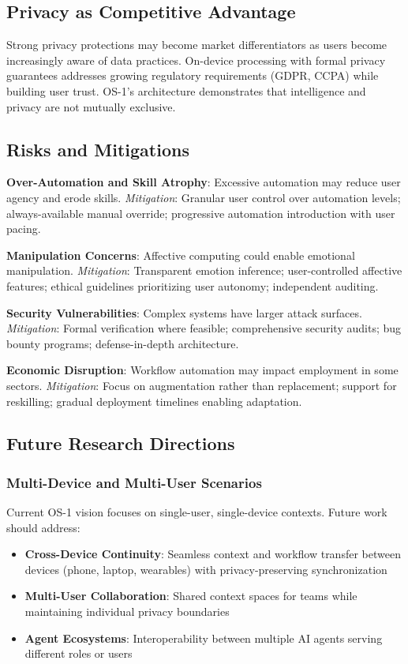 \documentclass[conference]{IEEEtran}
\begin{document}
\subsection{Privacy as Competitive Advantage}

Strong privacy protections may become market differentiators as users become increasingly aware of data practices. On-device processing with formal privacy guarantees addresses growing regulatory requirements (GDPR, CCPA) while building user trust. OS-1's architecture demonstrates that intelligence and privacy are not mutually exclusive.

\subsection{Risks and Mitigations}

\textbf{Over-Automation and Skill Atrophy}: Excessive automation may reduce user agency and erode skills. \textit{Mitigation}: Granular user control over automation levels; always-available manual override; progressive automation introduction with user pacing.

\textbf{Manipulation Concerns}: Affective computing could enable emotional manipulation. \textit{Mitigation}: Transparent emotion inference; user-controlled affective features; ethical guidelines prioritizing user autonomy; independent auditing.

\textbf{Security Vulnerabilities}: Complex systems have larger attack surfaces. \textit{Mitigation}: Formal verification where feasible; comprehensive security audits; bug bounty programs; defense-in-depth architecture.

\textbf{Economic Disruption}: Workflow automation may impact employment in some sectors. \textit{Mitigation}: Focus on augmentation rather than replacement; support for reskilling; gradual deployment timelines enabling adaptation.

\subsection{Future Research Directions}

\subsubsection{Multi-Device and Multi-User Scenarios}

Current OS-1 vision focuses on single-user, single-device contexts. Future work should address:
\begin{itemize}
\item \textbf{Cross-Device Continuity}: Seamless context and workflow transfer between devices (phone, laptop, wearables) with privacy-preserving synchronization
\item \textbf{Multi-User Collaboration}: Shared context spaces for teams while maintaining individual privacy boundaries
\item \textbf{Agent Ecosystems}: Interoperability between multiple AI agents serving different roles or users
\end{itemize}
\end{document}
